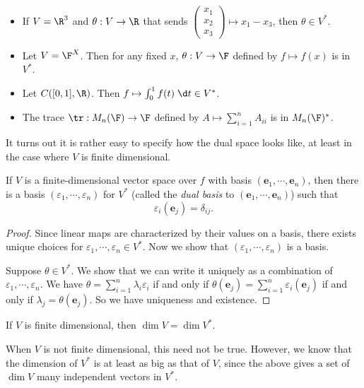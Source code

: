\documentclass[a4paper]{article}
\begin{document}
\begin{eg}\leavevmode
  \begin{itemize}
    \item If $V = \R^3$ and $\theta: V\to \R$ that sends $\begin{pmatrix}x_1\\x_2\\x_3\end{pmatrix} \mapsto x_1 - x_3$, then $\theta \in V^*$.
    \item Let $V = \F^X$. Then for any fixed $x$, $\theta: V\to \F$ defined by $f \mapsto f(x)$ is in $V^*$.
    \item Let $C([0, 1], \R)$. Then $f \mapsto \int_0^1 f(t)\;\d t \in V^*$.
    \item The trace $\tr: M_n(\F)\to \F$ defined by $A\mapsto \sum_{i = 1}^n A_{ii}$ is in $M_n(\F)^*$.
  \end{itemize}
\end{eg}

It turns out it is rather easy to specify how the dual space looks like, at least in the case where $V$ is finite dimensional.
\begin{lemma}
  If $V$ is a finite-dimensional vector space over $f$ with basis $(\mathbf{e}_1, \cdots, \mathbf{e}_n)$, then there is a basis $(\varepsilon_1, \cdots, \varepsilon_n)$ for $V^*$ (called the \emph{dual basis} to $(\mathbf{e}_1, \cdots, \mathbf{e}_n)$) such that
  \[
    \varepsilon_i(\mathbf{e}_j) = \delta_{ij}.
  \]
\end{lemma}

\begin{proof}
  Since linear maps are characterized by their values on a basis, there exists unique choices for $\varepsilon_1, \cdots, \varepsilon_n \in V^*$. Now we show that $(\varepsilon_1, \cdots, \varepsilon_n)$ is a basis.

  Suppose $\theta \in V^*$. We show that we can write it uniquely as a combination of $\varepsilon_1, \cdots, \varepsilon_n$. We have $\theta = \sum_{i = 1}^n \lambda_i \varepsilon_i$ if and only if $\theta(\mathbf{e}_j) = \sum_{i = 1}^n \varepsilon_i(\mathbf{e}_j)$ if and only if $\lambda_j = \theta(\mathbf{e}_j)$. So we have uniqueness and existence.
\end{proof}

\begin{cor}
  If $V$ is finite dimensional, then $\dim V = \dim V^*$.
\end{cor}
When $V$ is not finite dimensional, this need not be true. However, we know that the dimension of $V^*$ is at least as big as that of $V$, since the above gives a set of $\dim V$ many independent vectors in $V^*$.
\end{document}

